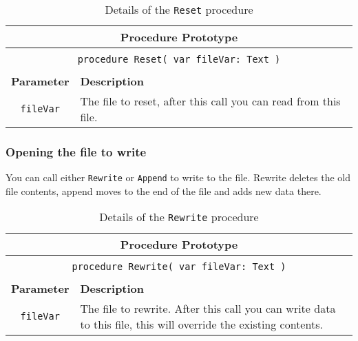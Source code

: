 \begin{table}[h]
  \centering
  \begin{tabular}{|c|p{9.5cm}|}
    \hline
    \multicolumn{2}{|c|}{\textbf{Procedure Prototype}} \\
    \hline
    \multicolumn{2}{|c|}{} \\
    \multicolumn{2}{|c|}{\texttt{procedure Reset( var fileVar: Text )}} \\
    \multicolumn{2}{|c|}{} \\
    \hline
    \textbf{Parameter} & \textbf{Description} \\
    \hline
    \texttt{ fileVar } & The file to reset, after this call you can read from this file.\\
    \hline
  \end{tabular}
  \caption{Details of the \texttt{Reset} procedure}
  \label{tbl:reset}
\end{table}


\subsubsection{Opening the file to write} %
\label{ssub:opening_the_file_to_write}

You can call either \texttt{Rewrite} or \texttt{Append} to write to the file. Rewrite deletes the old file contents, append moves to the end of the file and adds new data there.

\begin{table}[h]
  \centering
  \begin{tabular}{|c|p{9.5cm}|}
    \hline
    \multicolumn{2}{|c|}{\textbf{Procedure Prototype}} \\
    \hline
    \multicolumn{2}{|c|}{} \\
    \multicolumn{2}{|c|}{\texttt{procedure Rewrite( var fileVar: Text )}} \\
    \multicolumn{2}{|c|}{} \\
    \hline
    \textbf{Parameter} & \textbf{Description} \\
    \hline
    \texttt{ fileVar } & The file to rewrite. After this call you can write data to this file, this will override the existing contents.\\
    \hline
  \end{tabular}
  \caption{Details of the \texttt{Rewrite} procedure}
  \label{tbl:reset}
\end{table}

